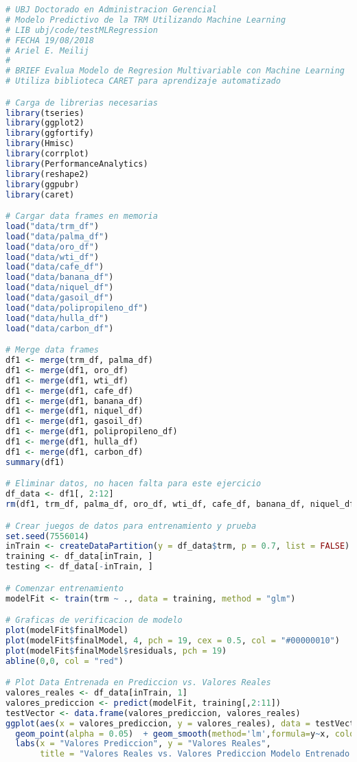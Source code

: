 \begin{lstlisting}[language=R]
# UBJ Doctorado en Administracion Gerencial
# Modelo Predictivo de la TRM Utilizando Machine Learning
# LIB ubj/code/testMLRegression
# FECHA 19/08/2018
# Ariel E. Meilij
#
# BRIEF Evalua Modelo de Regresion Multivariable con Machine Learning
# Utiliza biblioteca CARET para aprendizaje automatizado

# Carga de librerias necesarias
library(tseries)
library(ggplot2)
library(ggfortify)
library(Hmisc)
library(corrplot)
library(PerformanceAnalytics)
library(reshape2)
library(ggpubr)
library(caret)

# Cargar data frames en memoria
load("data/trm_df")
load("data/palma_df")
load("data/oro_df")
load("data/wti_df")
load("data/cafe_df")
load("data/banana_df")
load("data/niquel_df")
load("data/gasoil_df")
load("data/polipropileno_df")
load("data/hulla_df")
load("data/carbon_df")

# Merge data frames
df1 <- merge(trm_df, palma_df)
df1 <- merge(df1, oro_df)
df1 <- merge(df1, wti_df)
df1 <- merge(df1, cafe_df)
df1 <- merge(df1, banana_df)
df1 <- merge(df1, niquel_df)
df1 <- merge(df1, gasoil_df)
df1 <- merge(df1, polipropileno_df)
df1 <- merge(df1, hulla_df)
df1 <- merge(df1, carbon_df)
summary(df1)

# Eliminar datos, no hacen falta para este ejercicio
df_data <- df1[, 2:12]
rm(df1, trm_df, palma_df, oro_df, wti_df, cafe_df, banana_df, niquel_df, gasoil_df, polipropileno_df, hulla_df, carbon_df)

# Crear juegos de datos para entrenamiento y prueba
set.seed(7556014)
inTrain <- createDataPartition(y = df_data$trm, p = 0.7, list = FALSE)
training <- df_data[inTrain, ]
testing <- df_data[-inTrain, ]

# Comenzar entrenamiento
modelFit <- train(trm ~ ., data = training, method = "glm")

# Graficas de verificacion de modelo
plot(modelFit$finalModel)
plot(modelFit$finalModel, 4, pch = 19, cex = 0.5, col = "#00000010")
plot(modelFit$finalModel$residuals, pch = 19)
abline(0,0, col = "red")

# Plot Data Entrenada en Prediccion vs. Valores Reales
valores_reales <- df_data[inTrain, 1]
valores_prediccion <- predict(modelFit, training[,2:11])
testVector <- data.frame(valores_prediccion, valores_reales)
ggplot(aes(x = valores_prediccion, y = valores_reales), data = testVector) + 
  geom_point(alpha = 0.05)  + geom_smooth(method='lm',formula=y~x, colour = "green") + 
  labs(x = "Valores Prediccion", y = "Valores Reales", 
       title = "Valores Reales vs. Valores Prediccion Modelo Entrenado Regresion Multivariable")


\end{lstlisting}
